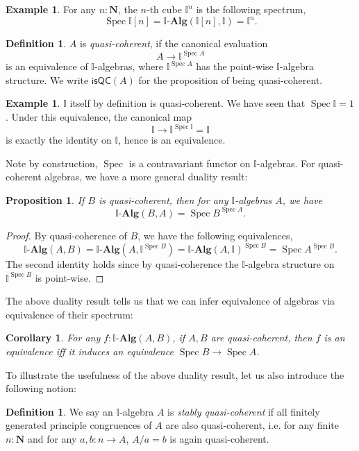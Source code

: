 \documentclass[12pt]{amsart}
\newtheorem{corollary}[theorem]{Corollary}
\newtheorem{proposition}[theorem]{Proposition}
\theoremstyle{definition}
\newtheorem{example}[theorem]{Example}
\newtheorem{definition}[theorem]{Definition}
\newcommand{\mb}[1]{\mathbf{#1}}
\newcommand{\mbb}[1]{\mathbb{#1}}
\newcommand{\I}{\mbb I}
\newcommand{\ms}[1]{\mathsf{#1}}
\newcommand{\alg}{\text{-}\mb{Alg}}
\newcommand{\N}{\mb N}
\newcommand{\spec}{\operatorname{Spec}}
\begin{document}
\begin{example}\label{exm:cubeaffine}
  For any $n:\N$, the $n$-th cube $\I^n$ is the following spectrum,
  \[ \spec \I[n] = \I\alg(\I[n],\I) = \I^n. \]
\end{example}

\begin{definition}
  $A$ is \emph{quasi-coherent}, if the canonical evaluation
  \[ A \to \I^{\spec A} \]
  is an equivalence of $\I$-algebras, where $\I^{\spec A}$ has the point-wise $\I$-algebra structure. We write $\ms{isQC}(A)$ for the proposition of being quasi-coherent.
\end{definition}

\begin{example}\label{exm:intervalqc}
  $\I$ itself by definition is quasi-coherent. We have seen that $\spec \I = 1$. Under this equivalence, the canonical map 
  \[ \I \to \I^{\spec \I} = \I \]
  is exactly the identity on $\I$, hence is an equivalence.
\end{example}

Note by construction, $\spec$ is a contravariant functor on $\I$-algebras. For quasi-coherent algebras, we have a more general duality result:

\begin{proposition}\label{prop:duality}
  If $B$ is quasi-coherent, then for any $\I$-algebras $A$, we have
  \[ \I\alg(B,A) = \spec B^{\spec A}. \]
\end{proposition}
\begin{proof}
  By quasi-coherence of $B$, we have the following equivalences,
  \[ \I\alg(A,B) = \I\alg(A,\I^{\spec B}) = \I\alg(A,\I)^{\spec B} = \spec A^{\spec B}. \]
  The second identity holds since by quasi-coherence the $\I$-algebra structure on $\I^{\spec B}$ is point-wise.
\end{proof}

The above duality result tells us that we can infer equivalence of algebras via equivalence of their spectrum:

\begin{corollary}\label{cor:dualityeqv}
  For any $f : \I\alg(A,B)$, if $A,B$ are quasi-coherent, then $f$ is an equivalence iff it induces an equivalence $\spec B \to \spec A$. 
\end{corollary}

To illustrate the usefulness of the above duality result, let us also introduce the following notion: 
\begin{definition}
  We say an $\I$-algebra $A$ is \emph{stably quasi-coherent} if all finitely generated principle congruences of $A$ are also quasi-coherent, i.e. for any finite $n : \N$ and for any $a,b : n \to A$, $A/a = b$ is again quasi-coherent.
\end{definition}
 
\end{document}
